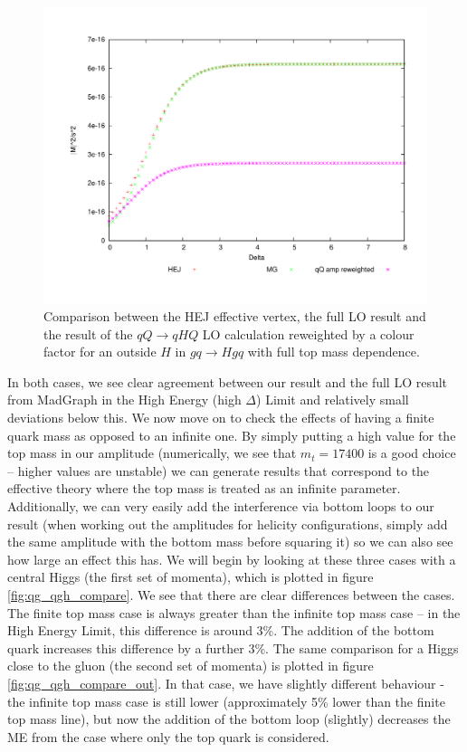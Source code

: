 \begin{figure}[t]
\centering
\includegraphics[scale=0.45]{Images/qg_qgH_outside.pdf}
\caption{Comparison between the HEJ effective vertex, the full LO result and the result of the $qQ \to qHQ$ LO calculation reweighted by a colour factor for an outside $H$ in $gq \to Hgq$ with full top mass dependence.}
\label{fig:gu_ghu_out}
\end{figure}
In both cases, we see clear agreement between our result and the full LO result from MadGraph in the High Energy (high $\Delta$) Limit and relatively small deviations below this. We now move on to check the effects of having a finite quark mass as opposed to an infinite one. By simply putting a high value for the top mass in our amplitude (numerically, we see that $m_t = 17400$ is a good choice -- higher values are unstable) we can generate results that correspond to the effective theory where the top mass is treated as an infinite parameter. Additionally, we can very easily add the interference via bottom loops to our result (when working out the amplitudes for helicity configurations, simply add the same amplitude with the bottom mass before squaring it) so we can also see how large an effect this has. We will begin by looking at these three cases with a central Higgs (the first set of momenta), which is plotted in figure \ref{fig:qg_qgh_compare}. We see that there are clear differences between the cases. The finite top mass case is always greater than the infinite top mass case -- in the High Energy Limit, this difference is around 3\%. The addition of the bottom quark increases this difference by a further 3\%. The same comparison for a Higgs close to the gluon (the second set of momenta) is plotted in figure \ref{fig:qg_qgh_compare_out}. In that case, we have slightly different behaviour - the infinite top mass case is still lower (approximately 5\% lower than the finite top mass line), but now the addition of the bottom loop (slightly) decreases the ME from the case where only the top quark is considered. 

